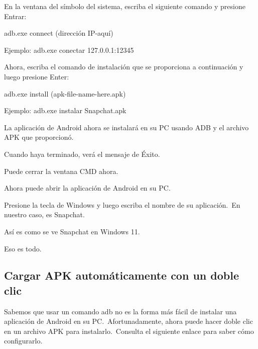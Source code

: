 \documentclass[
  a4paper,
]{article}
\begin{document}
En la ventana del símbolo del sistema, escriba el siguiente comando y
presione Entrar:

adb.exe connect (dirección IP-aquí)

Ejemplo: adb.exe conectar 127.0.0.1:12345

Ahora, escriba el comando de instalación que se proporciona a
continuación y luego presione Enter:

adb.exe install (apk-file-name-here.apk)

Ejemplo: adb.exe instalar Snapchat.apk

La aplicación de Android ahora se instalará en su PC usando ADB y el
archivo APK que proporcionó.

Cuando haya terminado, verá el mensaje de Éxito.

Puede cerrar la ventana CMD ahora.

Ahora puede abrir la aplicación de Android en su PC.

Presione la tecla de Windows y luego escriba el nombre de su
aplicación.~En nuestro caso, es Snapchat.

Así es como se ve Snapchat en Windows 11.

Eso es todo.

\subsection{Cargar APK automáticamente con un doble
clic}\label{cargar-apk-automuxe1ticamente-con-un-doble-clic}

Sabemos que usar un comando adb no es la forma más fácil de instalar una
aplicación de Android en su PC.~Afortunadamente, ahora puede hacer doble
clic en un archivo APK para instalarlo.~Consulta el siguiente enlace
para saber cómo configurarlo.


\printbibliography
\end{document}

